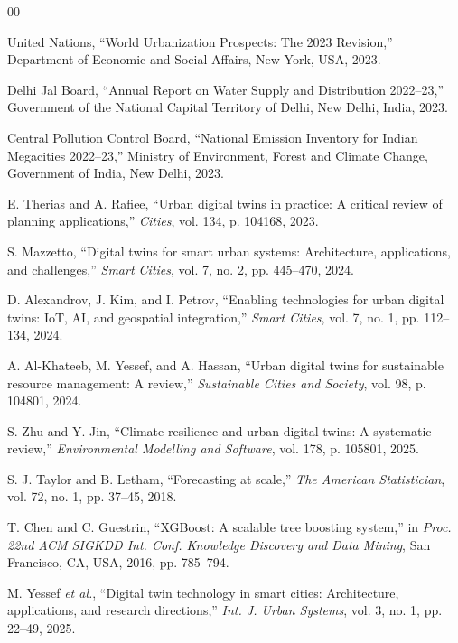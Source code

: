 \documentclass[conference]{IEEEtran}
\begin{document}
\begin{thebibliography}{00}

United Nations, ``World Urbanization Prospects: The 2023 Revision,''
Department of Economic and Social Affairs, New York, USA, 2023.

Delhi Jal Board, ``Annual Report on Water Supply and Distribution
2022--23,'' Government of the National Capital Territory of Delhi,
New Delhi, India, 2023.

Central Pollution Control Board, ``National Emission Inventory for
Indian Megacities 2022--23,'' Ministry of Environment, Forest and
Climate Change, Government of India, New Delhi, 2023.

E. Therias and A. Rafiee, ``Urban digital twins in practice: A critical
review of planning applications,'' \textit{Cities}, vol. 134,
p. 104168, 2023.

S. Mazzetto, ``Digital twins for smart urban systems: Architecture,
applications, and challenges,'' \textit{Smart Cities}, vol. 7, no. 2,
pp. 445--470, 2024.

D. Alexandrov, J. Kim, and I. Petrov, ``Enabling technologies for urban
digital twins: IoT, AI, and geospatial integration,''
\textit{Smart Cities}, vol. 7, no. 1, pp. 112--134, 2024.

A. Al-Khateeb, M. Yessef, and A. Hassan, ``Urban digital twins for
sustainable resource management: A review,''
\textit{Sustainable Cities and Society}, vol. 98, p. 104801, 2024.

S. Zhu and Y. Jin, ``Climate resilience and urban digital twins: A
systematic review,'' \textit{Environmental Modelling and Software},
vol. 178, p. 105801, 2025.

S. J. Taylor and B. Letham, ``Forecasting at scale,''
\textit{The American Statistician}, vol. 72, no. 1, pp. 37--45, 2018.

T. Chen and C. Guestrin, ``XGBoost: A scalable tree boosting system,''
in \textit{Proc. 22nd ACM SIGKDD Int. Conf. Knowledge Discovery and
Data Mining}, San Francisco, CA, USA, 2016, pp. 785--794.

M. Yessef \textit{et al.}, ``Digital twin technology in smart cities:
Architecture, applications, and research directions,''
\textit{Int. J. Urban Systems}, vol. 3, no. 1, pp. 22--49, 2025.


\end{thebibliography}
\end{document}
